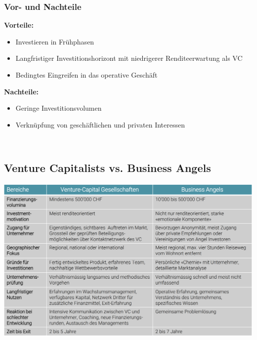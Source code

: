\subsubsection{Vor- und Nachteile}
\begin{multicols}{2}
	\textbf{Vorteile:}
	\begin{itemize}
		\item Investieren in Frühphasen
		\item Langfristiger Investitionshorizont mit niedrigerer Renditeerwartung als VC
		\item Bedingtes Eingreifen in das operative Geschäft
	\end{itemize}

	\textbf{Nachteile:}
	\begin{itemize}
		\item Geringe Investitionsvolumen
		\item Verknüpfung von geschäftlichen und privaten Interessen
	\end{itemize}
	\ \\
\end{multicols}

\subsection{Venture Capitalists vs. Business Angels}
\includegraphics[width=1\linewidth]{images/vc_vs_ba}
